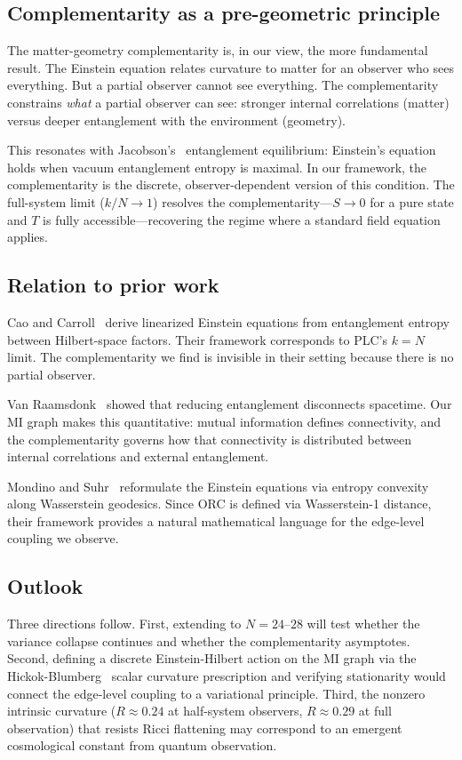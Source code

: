 \documentclass[aps,pra,twocolumn,superscriptaddress,floatfix]{revtex4-2}
\begin{document}
\subsection{Complementarity as a pre-geometric principle}

The matter-geometry complementarity is, in our view, the
more fundamental result.  The Einstein equation relates
curvature to matter for an observer who sees everything.
But a partial observer cannot see everything.  The
complementarity constrains \emph{what} a partial observer
can see: stronger internal correlations (matter) versus
deeper entanglement with the environment (geometry).

This resonates with Jacobson's~\cite{jacobson2016}
entanglement equilibrium: Einstein's equation holds
when vacuum entanglement entropy is maximal.  In our
framework, the complementarity is the discrete,
observer-dependent version of this condition.
The full-system limit ($k/N \to 1$) resolves the
complementarity---$S \to 0$ for a pure state and
$T$ is fully accessible---recovering the regime where
a standard field equation applies.

\subsection{Relation to prior work}

Cao and Carroll~\cite{cao2018} derive linearized
Einstein equations from entanglement entropy between
Hilbert-space factors.  Their framework corresponds
to PLC's $k = N$ limit.  The complementarity we find
is invisible in their setting because there is no
partial observer.

Van Raamsdonk~\cite{vanraamsdonk2010} showed that
reducing entanglement disconnects spacetime.  Our MI
graph makes this quantitative: mutual information
defines connectivity, and the complementarity governs
how that connectivity is distributed between internal
correlations and external entanglement.

Mondino and Suhr~\cite{mondino2023} reformulate the
Einstein equations via entropy convexity along Wasserstein
geodesics.  Since ORC is defined via Wasserstein-1
distance, their framework provides a natural mathematical
language for the edge-level coupling we observe.

\subsection{Outlook}

Three directions follow.  First, extending to $N = 24$--$28$
will test whether the variance collapse continues and
whether the complementarity asymptotes.  Second, defining a discrete
Einstein-Hilbert action on the MI graph via the
Hickok-Blumberg~\cite{hickok2025} scalar curvature
prescription and verifying stationarity would connect
the edge-level coupling to a variational principle.
Third, the nonzero intrinsic curvature ($R \approx 0.24$
at half-system observers, $R \approx 0.29$ at full observation)
that resists Ricci flattening may correspond to an
emergent cosmological constant from quantum observation.
\end{document}
